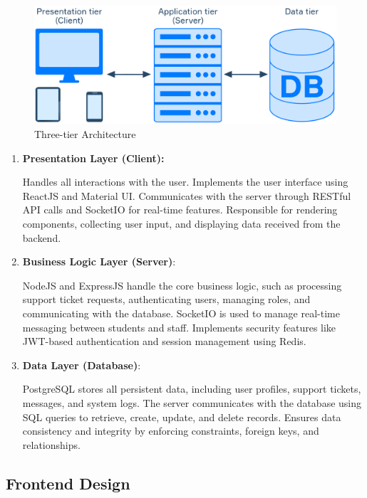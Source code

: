 \begin{figure}[H]
	\centering
	\includegraphics[width=0.7\columnwidth]{graphics/3-tier-arch.pdf}
	\caption{Three-tier Architecture \cite{3-tier}}
	\label{fig:3-tier}
\end{figure}


\begin{enumerate}
	\item \textbf{Presentation Layer (Client):}
	
	Handles all interactions with the user.
	Implements the user interface using ReactJS and Material UI.
	Communicates with the server through RESTful API calls and SocketIO for real-time features.
	Responsible for rendering components, collecting user input, and displaying data received from the backend.
	
	\item \textbf{Business Logic Layer (Server)}:
	
	NodeJS and ExpressJS handle the core business logic, such as processing support ticket requests, authenticating users, managing roles, and communicating with the database.
	SocketIO is used to manage real-time messaging between students and staff.
	Implements security features like JWT-based authentication and session management using Redis.
	
	\item \textbf{ Data Layer (Database)}:
	
	PostgreSQL stores all persistent data, including user profiles, support tickets, messages, and system logs.
	The server communicates with the database using SQL queries to retrieve, create, update, and delete records.
	Ensures data consistency and integrity by enforcing constraints, foreign keys, and relationships.
	
\end{enumerate}


\subsection{Frontend Design}












%	
	


	
